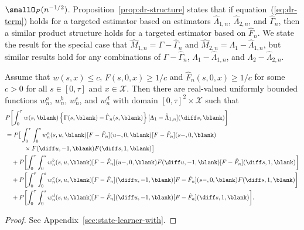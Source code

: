 \( \smallO_P{(n^{-1/2})}\). Proposition~\ref{prop:dr-structure} states that if
equation~(\ref{eq:dr-term}) holds for a targeted estimator based on estimators
$\hat{\Lambda}_{1,n}$, $\hat{\Lambda}_{2,n}$, and $\hat{\Gamma}_{n}$, then a
similar product structure holds for a targeted estimator based on
\( \hat{F}_n \). We state the result for the special case that
\(\hat{M}_{1,n}= \Gamma-\hat{\Gamma}_n \) and
\(\hat{M}_{2,n} =\Lambda_1-\hat{\Lambda}_{1,n} \), but similar results hold for
any combinations of \( \Gamma-\hat{\Gamma}_n\),
\( \Lambda_1-\hat{\Lambda}_{1,n} \), and \( \Lambda_2-\hat{\Lambda}_{2,n} \).
\begin{proposition}
  \label{prop:dr-structure}
  Assume that \( w(s,x)\leq c \), \( F(s, 0, x) \geq 1/c \) and
  \( \hat{F}_n(s, 0, x) \geq 1/c \) for some \( c>0 \) for all
  \( s \in [0, \tau] \) and \( x \in \mathcal{X} \). Then there are real-valued
  uniformly bounded functions \( w^a_n \), \( w^b_n \), \( w^c_n \), and
  \( w^d_n \) with domain \( [0,\tau]^2 \times \mathcal{X} \) such that
  \begin{align*}
    & P{\left[
      \int_0^{\tau} w(s, \blank)
      \left\{
      \Gamma(s,\blank) -\hat{\Gamma}_n(s,\blank)
      \right\}
      [\Lambda_1-\hat{\Lambda}_{1,n}]
      (\diff s, \blank)
      \right]}
    \\
     & =
      P{\big[
      \int_0^{\tau} \int_0^{s} w^a_n(s,u,\blank) [F - \hat{F}_n](u-, 0,
       \blank)[F - \hat{F}_n](s-, 0, \blank)}
    \\
    & \qquad \quad \times F(\diff u, -1, \blank ) F ( \diff s, 1, \blank)
      \big]
    \\
    & \quad +
      P{\left[
      \int_0^{\tau} \int_0^{s} w^b_n(s,u,\blank) [F - \hat{F}_n](u-, 0, \blank)
      F(\diff u, -1, \blank ) [F - \hat{F}_n](\diff s, 1, \blank)
      \right]}
    \\
    & \quad +
      P{\left[
      \int_0^{\tau} \int_0^{s} w^c_n(s,u,\blank) [F - \hat{F}_n](\diff u, -1, \blank)
      [F - \hat{F}_n](s-, 0, \blank)
      F(\diff s, 1, \blank ) 
      \right]}
    \\
    & \quad +
      P{\left[
      \int_0^{\tau} \int_0^{s} w^d_n(s,u,\blank) [F - \hat{F}_n](\diff u, -1, \blank)
      [F - \hat{F}_n](\diff s, 1, \blank)
      \right]}.
  \end{align*}
\end{proposition}
\begin{proof}
  See Appendix~\ref{sec:state-learner-with}.
\end{proof}



